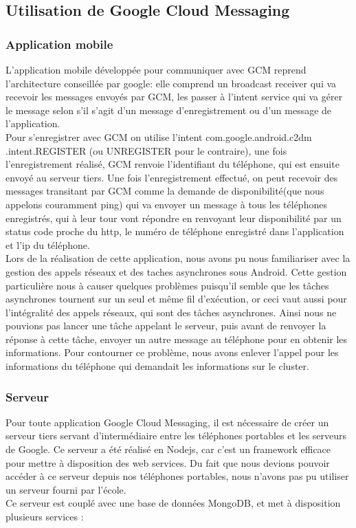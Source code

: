 \documentclass[a4paper,12pt]{article}
\begin{document}
\subsection{Utilisation de Google Cloud Messaging}

\subsubsection{Application mobile}
L’application mobile développée pour communiquer avec GCM reprend
l’architecture conseillée par google: elle comprend un broadcast receiver qui
va recevoir les messages envoyés par GCM, les passer à l’intent service qui va
gérer le message selon s’il s’agit d’un message d’enregistrement ou d’un
message de l’application.\\ Pour s’enregistrer avec GCM on utilise l’intent
com.google.android.c2dm
.intent.REGISTER (ou UNREGISTER pour le contraire), une
fois l’enregistrement réalisé, GCM renvoie l’identifiant du téléphone, qui est
ensuite envoyé au serveur tiers. Une fois l’enregistrement effectué, on peut
recevoir des messages transitant par GCM comme la demande de disponibilité(que
nous appelons couramment ping) qui va envoyer un message à tous les téléphones
enregistrés, qui à leur tour vont répondre en renvoyant leur disponibilité par
un status code proche du http, le numéro de téléphone enregistré dans
l’application et l’ip du téléphone.\\ Lors de la réalisation de cette
application, nous avons pu nous familiariser avec la gestion des appels réseaux
et des taches asynchrones sous Android. Cette gestion particulière nous à
causer quelques problèmes puisqu’il semble que les tâches asynchrones tournent
sur un seul et même fil d’exécution, or ceci vaut aussi pour l’intégralité des
appels réseaux, qui sont des tâches asynchrones. Ainsi nous ne pouvions pas
lancer une tâche appelant le serveur, puis avant de renvoyer la réponse à cette
tâche, envoyer un autre message au téléphone pour en obtenir les
informations. Pour contourner ce problème, nous avons enlever l’appel pour les
informations du téléphone qui demandait les informations sur le cluster.

\subsubsection{Serveur}
Pour toute application Google Cloud Messaging, il est nécessaire de créer un
serveur tiers servant d’intermédiaire entre les téléphones portables et les
serveurs de Google.  Ce serveur a été réalisé en Nodejs, car c’est un framework
efficace pour mettre à disposition des web services.  Du fait que nous devions
pouvoir accéder à ce serveur depuis nos téléphones portables, nous n’avons pas
pu utiliser un serveur fourni par l’école.\\
Ce serveur est couplé avec une base de données MongoDB, et met à disposition
plusieurs services :\\
\end{document}
